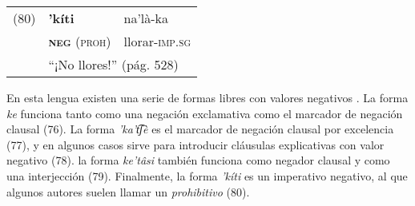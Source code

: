 {%
\begin{tabular}{lll}
(80) & \textbf{'kíti} & na'là-ka \\
& \textsc{\textbf{neg} (proh)} & llorar-\textsc{imp.sg}\\
& \multicolumn{2}{l}{``¡No llores!'' (pág. 528)}
\end{tabular} \vspace{0.5cm}

}

En esta lengua existen una serie de formas libres con valores negativos \textcolor{MidnightBlue}{\citep{tarahumara}}. La forma {\setmainfont{Charis SIL} \textit{ke}} funciona tanto como una negación exclamativa como el marcador de negación clausal (76). La forma {\setmainfont{Charis SIL} \textit{'ka't͡ʃè}} es el marcador de negación clausal por excelencia (77), y en algunos casos sirve para introducir cláusulas explicativas con valor negativo (78). la forma {\setmainfont{Charis SIL} \textit{ke'tâsi}} también funciona como negador clausal y como una interjección (79). Finalmente, la forma {\setmainfont{Charis SIL} \textit{'kíti}} es un imperativo negativo, al que algunos autores suelen llamar un \textit{prohibitivo} (80).